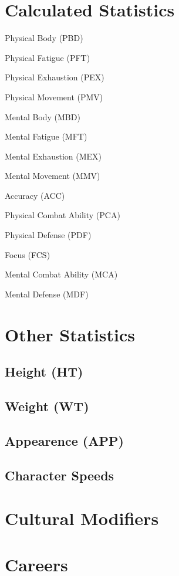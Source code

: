 \section{Calculated Statistics}

\begin{relate}
	\item[Physical Body (PBD)]
	\item[Physical Fatigue (PFT)]
	\item[Physical Exhaustion (PEX)]
	\item[Physical Movement (PMV)]
	\item[Mental Body (MBD)]
	\item[Mental Fatigue (MFT)]
	\item[Mental Exhaustion (MEX)]
	\item[Mental Movement (MMV)]
	\item[Accuracy (ACC)]
	\item[Physical Combat Ability (PCA)]
	\item[Physical Defense (PDF)]
	\item[Focus	(FCS)]
	\item[Mental Combat Ability (MCA)]
	\item[Mental Defense (MDF)]
\end{relate}

\section{Other Statistics}

\subsection{Height (HT)} 
\subsection{Weight (WT)} 
\subsection{Appearence        (APP)}
\subsection{Character Speeds}
\section{Cultural Modifiers}
\section{Careers}
